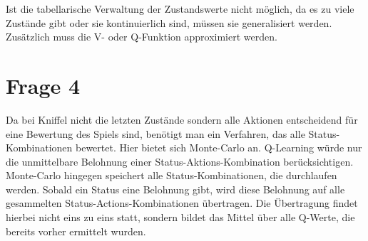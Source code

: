 \documentclass[10pt]{scrartcl}
\begin{document}
Ist die tabellarische Verwaltung der Zustandswerte nicht möglich, da es zu viele Zustände gibt oder sie kontinuierlich sind, müssen sie generalisiert werden. Zusätzlich muss die V- oder Q-Funktion approximiert werden.




\section{Frage 4}
Da bei Kniffel nicht die letzten Zustände sondern alle Aktionen entscheidend für eine Bewertung des Spiels sind, benötigt man ein Verfahren, das alle Status-Kombinationen bewertet. Hier bietet sich Monte-Carlo an. Q-Learning würde nur die unmittelbare Belohnung einer Status-Aktions-Kombination berücksichtigen.
Monte-Carlo hingegen speichert alle Status-Kombinationen, die durchlaufen
werden. Sobald ein Status eine Belohnung gibt, wird diese Belohnung auf alle gesammelten Status-Actions-Kombinationen übertragen. Die Übertragung findet hierbei nicht eins zu eins statt, sondern bildet das Mittel über alle Q-Werte, die bereits vorher ermittelt wurden.
\end{document}
